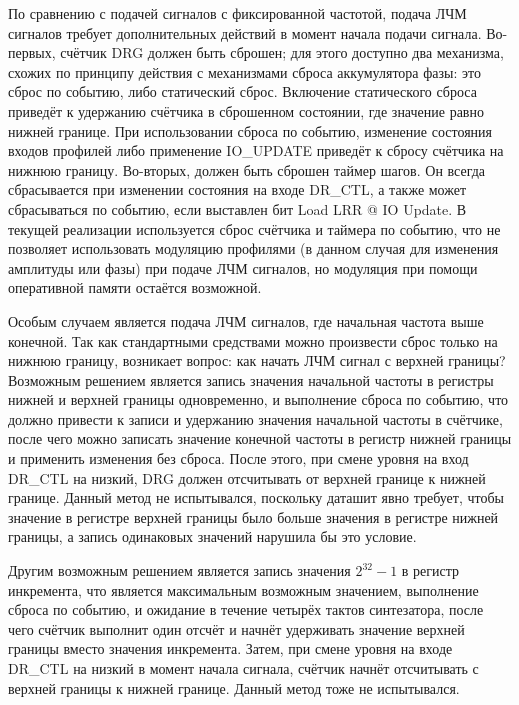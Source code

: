 \documentclass[rusmathsym, eqnumwithinsec, amspack, hyperref]{bomgost}
\begin{document}
По сравнению с подачей сигналов с фиксированной частотой, подача ЛЧМ сигналов требует дополнительных действий в момент начала подачи сигнала. Во-первых, счётчик DRG должен быть сброшен; для этого доступно два механизма, схожих по принципу действия с механизмами сброса аккумулятора фазы: это сброс по событию, либо статический сброс. Включение статического сброса приведёт к удержанию счётчика в сброшенном состоянии, где значение равно нижней границе. При использовании сброса по событию, изменение состояния входов профилей либо применение IO\_UPDATE приведёт к сбросу счётчика на нижнюю границу. Во-вторых, должен быть сброшен таймер шагов. Он всегда сбрасывается при изменении состояния на входе DR\_CTL, а также может сбрасываться по событию, если выставлен бит Load LRR @ IO Update. В текущей реализации используется сброс счётчика и таймера по событию, что не позволяет использовать модуляцию профилями (в данном случая для изменения амплитуды или фазы) при подаче ЛЧМ сигналов, но модуляция при помощи оперативной памяти остаётся возможной.

Особым случаем является подача ЛЧМ сигналов, где начальная частота выше конечной. Так как стандартными средствами можно произвести сброс только на нижнюю границу, возникает вопрос: как начать ЛЧМ сигнал с верхней границы? Возможным решением является запись значения начальной частоты в регистры нижней и верхней границы одновременно, и выполнение сброса по событию, что должно привести к записи и удержанию значения начальной частоты в счётчике, после чего можно записать значение конечной частоты в регистр нижней границы и применить изменения без сброса. После этого, при смене уровня на вход DR\_CTL на низкий, DRG должен отсчитывать от верхней границе к нижней границе. Данный метод не испытывался, поскольку даташит явно требует, чтобы значение в регистре верхней границы было больше значения в регистре нижней границы, а запись одинаковых значений нарушила бы это условие.

Другим возможным решением является запись значения $2^{32}-1$ в регистр инкремента, что является максимальным возможным значением, выполнение сброса по событию, и ожидание в течение четырёх тактов синтезатора, после чего счётчик выполнит один отсчёт и начнёт удерживать значение верхней границы вместо значения инкремента. Затем, при смене уровня на входе DR\_CTL на низкий в момент начала сигнала, счётчик начнёт отсчитывать с верхней границы к нижней границе. Данный метод тоже не испытывался.
\end{document}
